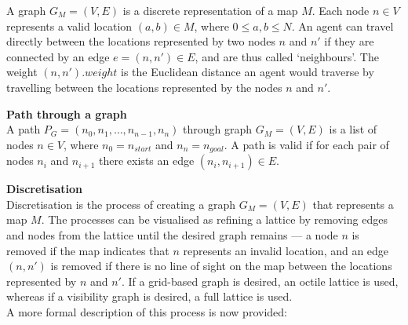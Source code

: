\documentclass[12pt,notitlepage]{report}
\begin{document}
A graph $G_{M}=(V,E)$ is a discrete representation of a map $M$. Each node $n \in V$ represents a valid location $(a,b) \in M$, where $0 \leq a,b \leq N$. An agent can travel directly between the locations represented by two nodes $n$ and $n'$ if they are connected by an edge $e=(n,n') \in E$, and are thus called `neighbours'. The weight $(n,n').weight$ is the Euclidean distance an agent would traverse by travelling between the locations represented by the nodes $n$ and $n'$.\\
\begin{description}
\item{\bfseries Path through a graph}\\
A path $P_{G} = (n_{0}, n_{1}, \ldots, n_{n-1}, n_{n})$ through graph $G_{M}=(V,E)$ is a list of nodes $n \in V$, where $n_{0}=n_{start}$ and $n_{n}=n_{goal}$. A path is valid if for each pair of nodes $n_{i}$ and $n_{i+1}$ there exists an edge $(n_{i},n_{i+1}) \in E$.
\end{description}

\noindent
{\bfseries Discretisation}\\
\noindent
Discretisation is the process of creating a graph $G_{M}=(V,E)$ that represents a map $M$. The processes can be visualised as refining a lattice by removing edges and nodes from the lattice until the desired graph remains --- a node $n$ is removed if the map indicates that $n$ represents an invalid location, and an edge $(n,n')$ is removed if there is no line of sight on the map between the locations represented by $n$ and $n'$. If a grid-based graph is desired, an octile lattice is used, whereas if a visibility graph is desired, a full lattice is used.\\ 

\noindent
A more formal description of this process is now provided:
\end{document}

